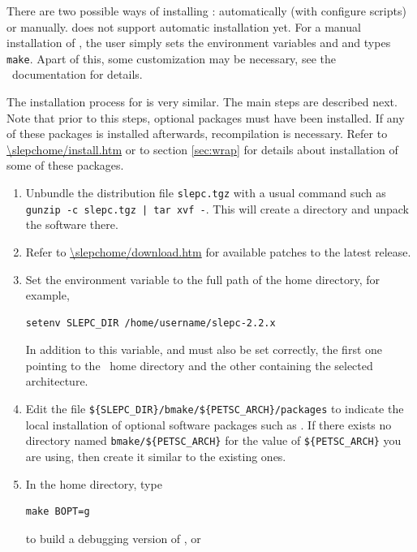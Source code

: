 	There are two possible ways of installing \petsc: automatically (with configure scripts) or manually. \slepc does not support automatic installation yet. For a manual installation of \petsc, the user simply sets the environment variables  and  and types \texttt{make}. Apart of this, some customization may be necessary, see the \petsc\ documentation for details.

	The installation process for \slepc is very similar. The main steps are described next. Note that prior to this steps, optional packages must have been installed. If any of these packages is installed afterwards, recompilation is necessary. Refer to \url{\slepchome/install.htm} or to section \ref{sec:wrap} for details about installation of some of these packages.

\begin{enumerate}
	\item Unbundle the distribution file \Verb!slepc.tgz! with a usual command such as \Verb!gunzip -c slepc.tgz | tar xvf -!. This will create a directory and unpack the software there.
	\item Refer to \url{\slepchome/download.htm} for available patches to the latest \slepc release.
	\item Set the environment variable  to the full path of the \slepc home directory, for example,
	\begin{Verbatim}[fontsize=\small]
	setenv SLEPC_DIR /home/username/slepc-2.2.x
	\end{Verbatim}
	In addition to this variable,  and  must also be set correctly, the first one pointing to the \petsc\ home directory and the other containing the selected architecture.%
	\item Edit the file \Verb!${SLEPC_DIR}/bmake/${PETSC_ARCH}/packages! to indicate the local installation of optional software packages such as \arpack. If there exists no directory named \Verb!bmake/${PETSC_ARCH}! for the value of \Verb!${PETSC_ARCH}! you are using, then create it similar to the existing ones.
	\item In the \slepc home directory, type
	\begin{Verbatim}[fontsize=\small]
	make BOPT=g
	\end{Verbatim}
      to build a debugging version of \slepc, or
	\begin{Verbatim}[fontsize=\small]

\end{Verbatim}
\end{enumerate}
